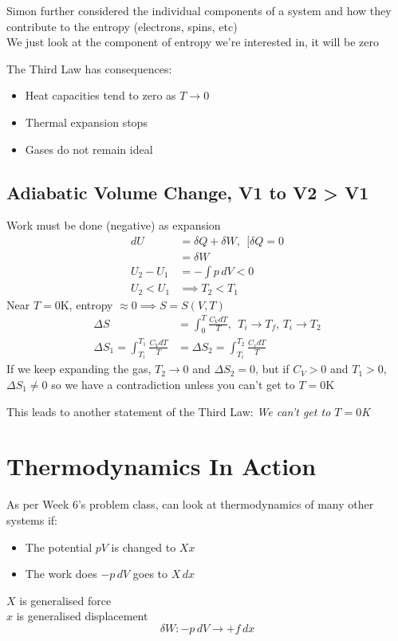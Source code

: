 \documentclass[a4paper, 11pt, normalem]{report}
\begin{document}
Simon further considered the individual components of a system and how they contribute to the entropy (electrons, spins, etc) \\
We just look at the component of entropy we're interested in, it will be zero

The Third Law has consequences:
\begin{itemize}
    \item Heat capacities tend to zero as $T \to 0$
    \item Thermal expansion stops
    \item Gases do not remain ideal
\end{itemize}

\subsection{Adiabatic Volume Change, V1 to V2 > V1}
Work must be done (negative) as expansion
\begin{align*}
    dU &= \delta Q + \delta W, ~~[\delta Q = 0 \\
    &= \delta W \\
    U_2 - U_1 &= -\int p\,dV < 0 \\
    U_2 < U_1 &\implies T_2 < T_1
\end{align*}
Near $T = 0$K, entropy $\approx 0 \implies S = S(V, T)$
\begin{align*}
    \Delta S &= \int_{0}^{T} \frac{C_V dT}{T},~~ T_i \to T_f,\,T_i \to T_2 \\
    \Delta S_1 = \int_{T_i}^{T_1} \frac{C_V dT}{T} &= \Delta S_2 = \int_{T_i}^{T_2} \frac{C_v dT}{T}
\end{align*}
If we keep expanding the gas, $T_2 \to 0$ and $\Delta S_2 = 0$, but if $C_V > 0$ and $T_1 > 0$, $\Delta S_1 \neq 0$ so we have a contradiction unless you can't get to $T = 0$K

This leads to another statement of the Third Law: \emph{We can't get to $T = 0$K}

\section{Thermodynamics In Action}
As per Week 6's problem class, can look at thermodynamics of many other systems if:
\begin{itemize}
    \item The potential $pV$ is changed to $Xx$
    \item The work does $-p\,dV$ goes to $X\,dx$
\end{itemize}
$X$ is generalised force \\
$x$ is generalised displacement
\begin{equation*}
    \delta W: -p\,dV \to +f\,dx
\end{equation*}
\end{document}
